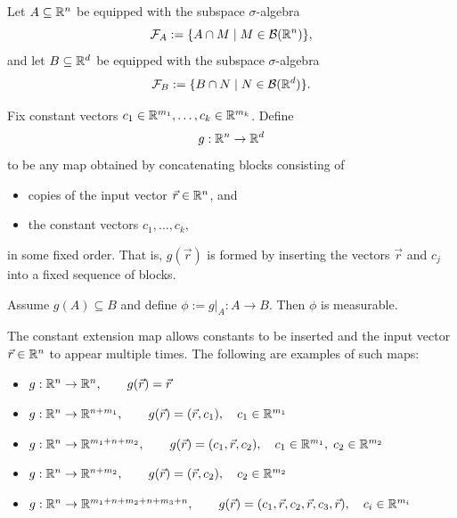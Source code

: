
\begin{lemma}\label{lem:constant-extension-measurable}
	Let $A \subseteq \mathbb{R}^n$ be equipped with the subspace $\sigma$-algebra
	\[
	\mathcal{F}_A := \{A \cap M \mid M \in \mathcal{B}(\mathbb{R}^n)\},
	\]
	and let $B \subseteq \mathbb{R}^d$ be equipped with the subspace $\sigma$-algebra
	\[
	\mathcal{F}_B := \{B \cap N \mid N \in \mathcal{B}(\mathbb{R}^d)\}.
	\]
	
	Fix constant vectors $c_1 \in \mathbb{R}^{m_1},\dots,c_k \in \mathbb{R}^{m_k}$.
	Define
	\[
	g : \mathbb{R}^n \to \mathbb{R}^d
	\]
	to be any map obtained by concatenating blocks consisting of
	
	\begin{itemize}
	\item copies of the input vector $\vec r \in \mathbb{R}^n$, and
	\item the constant vectors $c_1,\dots,c_k$,
	\end{itemize}
	
	in some fixed order. That is, $g(\vec r)$ is formed by inserting the vectors
	$\vec r$ and $c_j$ into a fixed sequence of blocks.
	
	Assume $g(A) \subseteq B$ and define $\phi := g|_A : A \to B$.
	Then $\phi$ is measurable.
\end{lemma}

\begin{example}\label{ex:coord-wiring}
	The constant extension map allows constants to be inserted and the input vector
	$\vec r \in \mathbb{R}^n$ to appear multiple times. The following are examples of such maps:
	\begin{itemize}
		\item $g : \mathbb{R}^n \to \mathbb{R}^n, \qquad g(\vec r) = \vec r$

		\item $g : \mathbb{R}^n \to \mathbb{R}^{n + m_1}, \qquad g(\vec r) = (\vec r, c_1), \quad c_1 \in \mathbb{R}^{m_1}$

		\item $g : \mathbb{R}^n \to \mathbb{R}^{m_1 + n + m_2}, \qquad g(\vec r) = (c_1, \vec r, c_2), \quad c_1 \in \mathbb{R}^{m_1},\; c_2 \in \mathbb{R}^{m_2}$

		\item $g : \mathbb{R}^n \to \mathbb{R}^{n + m_2}, \qquad g(\vec r) = (\vec r, c_2), \quad c_2 \in \mathbb{R}^{m_2}$

		\item $g : \mathbb{R}^n \to \mathbb{R}^{m_1 + n + m_2 + n + m_3 + n}, \qquad g(\vec r) = (c_1, \vec r, c_2, \vec r, c_3, \vec r), \quad c_i \in \mathbb{R}^{m_i}$
	\end{itemize}
\end{example}

